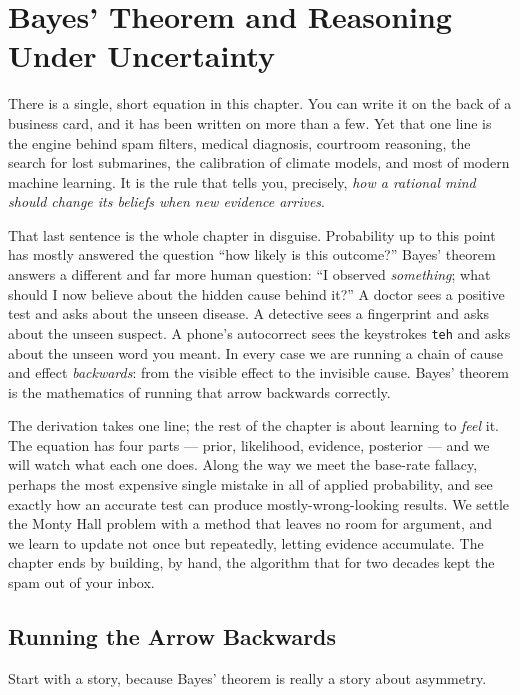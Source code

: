 \chapter{Bayes' Theorem and Reasoning Under Uncertainty}

There is a single, short equation in this chapter. You can write it on the back of a
business card, and it has been written on more than a few. Yet that one line is the
engine behind spam filters, medical diagnosis, courtroom reasoning, the search for lost
submarines, the calibration of climate models, and most of modern machine learning. It
is the rule that tells you, precisely, \emph{how a rational mind should
change its beliefs when new evidence arrives}.

That last sentence is the whole chapter in disguise.
Probability up to this point has mostly answered the question ``how likely is this
outcome?'' Bayes' theorem answers a different and far more human question: ``I observed
\emph{something}; what should I now believe about the hidden cause behind it?'' A doctor
sees a positive test and asks about the unseen disease. A detective sees a fingerprint
and asks about the unseen suspect. A phone's autocorrect sees the keystrokes
\texttt{teh} and asks about the unseen word you meant. In every case we are running a
chain of cause and effect \emph{backwards}: from the visible effect to the invisible
cause. Bayes' theorem is the mathematics of running that arrow backwards correctly.

The derivation takes one line; the rest of the chapter is about learning to
\emph{feel} it. The equation has four parts --- prior, likelihood, evidence, posterior
--- and we will watch what each one does. Along the way we meet the base-rate fallacy, perhaps the most
expensive single mistake in all of applied probability, and see exactly how an accurate
test can produce mostly-wrong-looking results. We settle the Monty Hall
problem with a method that leaves no room for argument, and we learn to update
not once but repeatedly, letting evidence accumulate. The chapter ends by building, by
hand, the algorithm that for two decades kept the spam out of your inbox.

\chapterline

\section{Running the Arrow Backwards}
\label{ch05:backwards}

Start with a story, because Bayes' theorem is really a story about asymmetry.

